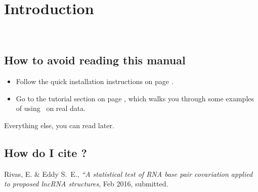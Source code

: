 \section{Introduction}
\setcounter{footnote}{0}

\rscape\ 

\subsection{How to avoid reading this manual}

\begin{itemize}
\item Follow the quick installation instructions on page
      \pageref{section:installation}. 
\item Go to the tutorial section on page
\pageref{section:tutorial}, which walks you through some examples of
using \rscape\ on real data.
\end{itemize}

Everything else, you can read later.



\subsection{How do I cite \rscape?}

Rivas, E. \& Eddy S.~E., \textit{``A statistical test of RNA base pair
  covariation applied to proposed lncRNA structures}, Feb 2016, submitted.













  









